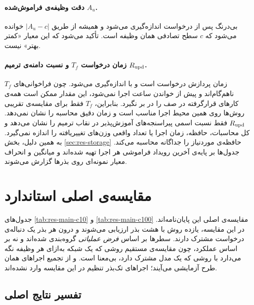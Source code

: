 \paragraph{دقت وظیفه‌ی فراموش‌شده $A_u$.} بی‌درنگ پس از درخواست اندازه‌گیری می‌شود و همیشه از طریق $|A_u-c|$ خوانده می‌شود که $c$ سطح تصادفی همان وظیفه است. تأکید می‌شود که این معیار «کمتر بهتر» نیست.

\paragraph{زمان درخواست $T_f$ و نسبت دامنه‌ی ترمیم $R_{\mathrm{upd}}$.} $T_f$ زمان پردازش درخواست است و با  اندازه‌گیری می‌شود. چون فراخوانی‌های  ناهم‌گام‌اند و پیش از خواندن ساعت  اجرا نمی‌شود، این مقدار ممکن است همه‌ی کارهای قرارگرفته در صف را در بر نگیرد. بنابراین، $T_f$ فقط برای مقایسه‌ی تقریبی روش‌ها روی همین محیط اجرا مناسب است و زمان دقیق محاسبه را نشان نمی‌دهد. $R_{\mathrm{upd}}$ فقط نسبت اسمی پیراسنجه‌های آموزش‌پذیر در نقاب ترمیم را نشان می‌دهد و کل محاسبات، حافظه، زمان اجرا یا تعداد واقعی وزن‌های تغییریافته را اندازه نمی‌گیرد. به همین دلیل، بخش \ref{sec:res-storage} حافظه‌ی موردنیاز را جداگانه محاسبه می‌کند. جدول‌ها بر پایه‌ی آخرین رویداد فراموشی هر اجرا تهیه شده‌اند و میانگین و انحراف معیار نمونه‌ای روی بذرها گزارش می‌شوند.

\section{مقایسه‌ی اصلی استاندارد}
\label{subsec:res-main}

جدول‌های \ref{tab:res-main-c10} و \ref{tab:res-main-c100} مقایسه‌ی اصلی این پایان‌نامه‌اند. در این مقایسه، یازده روش با هشت بذر ارزیابی می‌شوند و درون هر بذر یک دنباله‌ی درخواست مشترک دارند. سطرها بر اساس \emph{فرض عملیاتی} گروه‌بندی شده‌اند و نه بر اساس عملکرد، چون مقایسه‌ی مستقیم روشی که یک شبکه به‌ازای هر وظیفه نگه می‌دارد با روشی که یک مدل مشترک دارد، بی‌معنا است.  و  از تجمیع اجراهای همان طرح آزمایشی می‌آیند؛ اجراهای تک‌بذر تنظیم  در این مقایسه وارد نشده‌اند.





\subsection{تفسیر نتایج اصلی}
\label{subsec:res-main-read}

